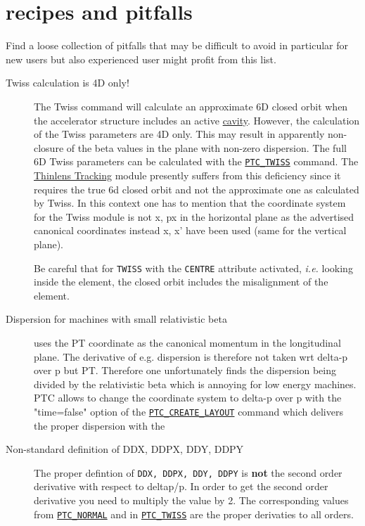 
\chapter{\madx recipes and pitfalls}

Find a loose collection of pitfalls that may be difficult to avoid in
particular for new users but also experienced user might profit from
this list.  


\begin{description}

\item[Twiss calculation is 4D only!]  The Twiss command will calculate
  an approximate 6D closed orbit when the accelerator structure includes
  an active \hyperref[sec:rf-cavity]{cavity}. However, the calculation of
  the Twiss parameters are 4D only. This may result in apparently
  non-closure of the beta values in the plane with non-zero
  dispersion. The full 6D Twiss parameters can be calculated with the
  \hyperref[chap:ptc-twiss]{\texttt{PTC\_TWISS}} command.  The
  \hyperref[chap:thintrack]{Thinlens Tracking} module presently suffers
  from this deficiency since it requires the true 6d closed orbit and
  not the approximate one as calculated by Twiss. In this context one
  has to mention that the coordinate system for the Twiss module is not
  x, px in the horizontal plane as the advertised canonical coordinates
  instead x, x' have been used (same for the vertical plane).
  
  Be careful that for \texttt{TWISS} with the \texttt{CENTRE} attribute
  activated, \textsl{i.e.} looking inside the element, the closed orbit
  includes the misalignment of the element.  

  
\item[Dispersion for machines with small relativistic beta] 
  \madx uses the PT coordinate as the canonical momentum in the
  longitudinal plane. The derivative of e.g. dispersion is therefore
  not taken wrt delta-p over p but PT. Therefore one unfortunately finds the
  dispersion being divided by the relativistic beta which is annoying
  for low energy machines. PTC allows to change the coordinate system
  to  delta-p over p with the "time=false" option of the
  \hyperref[sec:ptc-create-layout]{\texttt{PTC\_CREATE\_LAYOUT}}
  command which delivers the proper dispersion with the


\item[Non-standard definition of DDX, DDPX, DDY, DDPY] 
  The \madx proper defintion of \texttt{DDX, DDPX, DDY, DDPY} is
  \textbf{not} the second order derivative with respect to deltap/p. 
   In order to get the second order derivative you need to multiply the value by 2. 
   The corresponding values from
  \hyperref[chap:ptc-normal]{\texttt{PTC\_NORMAL}} and in
  \hyperref[chap:ptc-twiss]{\texttt{PTC\_TWISS}} are the proper
  derivaties to all orders. 
  


\end{description}
